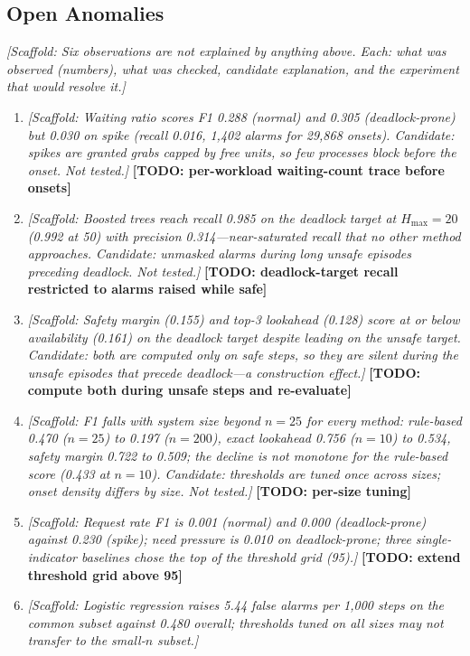 \documentclass[conference]{IEEEtran}
\newcommand{\scaffold}[1]{\textcolor{blue!60!black}{\textit{[Scaffold: #1]}}}
\newcommand{\todo}[1]{\textcolor{red!70!black}{\textbf{[TODO: #1]}}}
\newcommand{\anomaly}[1]{\textbf{(#1)}}
\begin{document}
\subsection{Open Anomalies}\label{sec:anomalies}
\scaffold{Six observations are not explained by anything above. Each: what was observed (numbers), what was checked, candidate explanation, and the experiment that would resolve it.}
\begin{enumerate}
\item[\anomaly{A1}] \scaffold{Waiting ratio scores F1 0.288 (normal) and 0.305 (deadlock-prone) but 0.030 on spike (recall 0.016, 1,402 alarms for 29,868 onsets). Candidate: spikes are granted grabs capped by free units, so few processes block before the onset. Not tested.} \todo{per-workload waiting-count trace before onsets}
\item[\anomaly{A2}] \scaffold{Boosted trees reach recall 0.985 on the deadlock target at $H_{\max}=20$ (0.992 at 50) with precision 0.314---near-saturated recall that no other method approaches. Candidate: unmasked alarms during long unsafe episodes preceding deadlock. Not tested.} \todo{deadlock-target recall restricted to alarms raised while safe}
\item[\anomaly{A3}] \scaffold{Safety margin (0.155) and top-3 lookahead (0.128) score at or below availability (0.161) on the deadlock target despite leading on the unsafe target. Candidate: both are computed only on safe steps, so they are silent during the unsafe episodes that precede deadlock---a construction effect.} \todo{compute both during unsafe steps and re-evaluate}
\item[\anomaly{A4}] \scaffold{F1 falls with system size beyond $n=25$ for every method: rule-based 0.470 ($n=25$) to 0.197 ($n=200$), exact lookahead 0.756 ($n=10$) to 0.534, safety margin 0.722 to 0.509; the decline is not monotone for the rule-based score (0.433 at $n=10$). Candidate: thresholds are tuned once across sizes; onset density differs by size. Not tested.} \todo{per-size tuning}
\item[\anomaly{A5}] \scaffold{Request rate F1 is 0.001 (normal) and 0.000 (deadlock-prone) against 0.230 (spike); need pressure is 0.010 on deadlock-prone; three single-indicator baselines chose the top of the threshold grid (95).} \todo{extend threshold grid above 95}
\item[\anomaly{A6}] \scaffold{Logistic regression raises 5.44 false alarms per 1,000 steps on the common subset against 0.480 overall; thresholds tuned on all sizes may not transfer to the small-$n$ subset.}
\end{enumerate}
\end{document}
